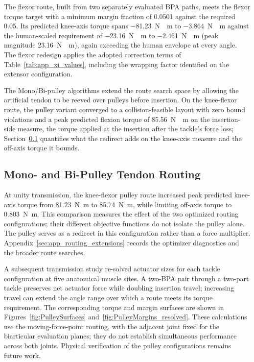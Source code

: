 The flexor route, built from two separately evaluated BPA paths, meets the flexor torque target with a minimum margin fraction of 0.0501 against the required 0.05. Its predicted knee-axis torque spans \qty{-81.23}{\newton\cdot\meter} to \qty{-3.864}{\newton\cdot\meter} against the human-scaled requirement of \qty{-23.16}{\newton\cdot\meter} to \qty{-2.461}{\newton\cdot\meter} (peak magnitude \qty{23.16}{\newton\cdot\meter}), again exceeding the human envelope at every angle. The flexor redesign applies the adopted correction terms of Table~\ref{tab:app_xi_values}, including the wrapping factor identified on the extensor configuration.

The Mono/Bi-pulley algorithms extend the route search space by allowing the artificial tendon to be reeved over pulleys before insertion. On the knee-flexor route, the pulley variant converged to a collision-feasible layout with zero bound violations and a peak predicted flexion torque of \qty{85.56}{\newton\cdot\meter} on the insertion-side measure, the torque applied at the insertion after the tackle's force loss; Section~\ref{sec:disc_pulley} quantifies what the redirect adds on the knee-axis measure and the off-axis torque it bounds.












\subsection{Mono- and Bi-Pulley Tendon Routing}\label{sec:disc_pulley}

At unity transmission, the knee-flexor pulley route increased peak predicted knee-axis torque from \qty{81.23}{\newton\meter} to \qty{85.74}{\newton\meter}, while limiting off-axis torque to \qty{0.803}{\newton\meter}. This comparison measures the effect of the two optimized routing configurations; their different objective functions do not isolate the pulley alone. The pulley serves as a redirect in this configuration rather than a force multiplier. Appendix~\ref{sec:app_routing_extensions} records the optimizer diagnostics and the broader route searches.

A subsequent transmission study re-solved actuator sizes for each tackle configuration at five anatomical muscle sites. A two-BPA pair through a two-part tackle preserves net actuator force while doubling insertion travel; increasing travel can extend the angle range over which a route meets its torque requirement. The corresponding torque and margin surfaces are shown in Figures~\ref{fig:PulleySurfaces} and~\ref{fig:PulleyMargins_resolved}. These calculations use the moving-force-point routing, with the adjacent joint fixed for the biarticular evaluation planes; they do not establish simultaneous performance across both joints. Physical verification of the pulley configurations remains future work.

